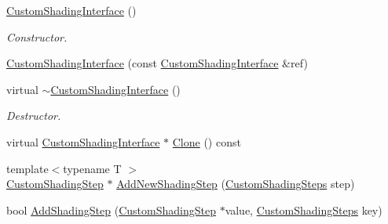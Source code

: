 \begin{DoxyCompactItemize}
\item 
\mbox{\label{class_geometry_engine_1_1_custom_shading_1_1_custom_shading_interface_ae14287e6f2109d2d78eb8854b544d7f5}} 
\mbox{\hyperlink{class_geometry_engine_1_1_custom_shading_1_1_custom_shading_interface_ae14287e6f2109d2d78eb8854b544d7f5}{Custom\+Shading\+Interface}} ()
\begin{DoxyCompactList}\small\item\em Constructor. \end{DoxyCompactList}\item 
\mbox{\hyperlink{class_geometry_engine_1_1_custom_shading_1_1_custom_shading_interface_ad1dcc337f5f6d31dc58e34ad5225629b}{Custom\+Shading\+Interface}} (const \mbox{\hyperlink{class_geometry_engine_1_1_custom_shading_1_1_custom_shading_interface}{Custom\+Shading\+Interface}} \&ref)
\item 
\mbox{\label{class_geometry_engine_1_1_custom_shading_1_1_custom_shading_interface_a06525a1ab9b83b35d1584e86c5b2350b}} 
virtual \mbox{\hyperlink{class_geometry_engine_1_1_custom_shading_1_1_custom_shading_interface_a06525a1ab9b83b35d1584e86c5b2350b}{$\sim$\+Custom\+Shading\+Interface}} ()
\begin{DoxyCompactList}\small\item\em Destructor. \end{DoxyCompactList}\item 
virtual \mbox{\hyperlink{class_geometry_engine_1_1_custom_shading_1_1_custom_shading_interface}{Custom\+Shading\+Interface}} $\ast$ \mbox{\hyperlink{class_geometry_engine_1_1_custom_shading_1_1_custom_shading_interface_a5fadd669b771d5782f3aed2303862bbe}{Clone}} () const
\item 
{\footnotesize template$<$typename T $>$ }\\\mbox{\hyperlink{class_geometry_engine_1_1_custom_shading_1_1_custom_shading_step}{Custom\+Shading\+Step}} $\ast$ \mbox{\hyperlink{class_geometry_engine_1_1_custom_shading_1_1_custom_shading_interface_add17f0c72329bd4c36c5eca34b68007b}{Add\+New\+Shading\+Step}} (\mbox{\hyperlink{namespace_geometry_engine_1_1_custom_shading_a2dc236a5b567da5099069ce2b2be5609}{Custom\+Shading\+Steps}} step)
\item 
bool \mbox{\hyperlink{class_geometry_engine_1_1_custom_shading_1_1_custom_shading_interface_ae0eae78736701db330dd03ecc18ef044}{Add\+Shading\+Step}} (\mbox{\hyperlink{class_geometry_engine_1_1_custom_shading_1_1_custom_shading_step}{Custom\+Shading\+Step}} $\ast$value, \mbox{\hyperlink{namespace_geometry_engine_1_1_custom_shading_a2dc236a5b567da5099069ce2b2be5609}{Custom\+Shading\+Steps}} key)

\end{DoxyCompactItemize}
